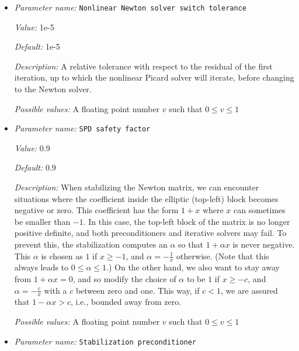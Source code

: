 \begin{itemize}
{\it Possible values:} A floating point number $v$ such that $0 \leq v \leq 1$
\item {\it Parameter name:} {\tt Nonlinear Newton solver switch tolerance}
\label{parameters:Solver parameters/Newton solver parameters/Nonlinear Newton solver switch tolerance}


{\it Value:} 1e-5


{\it Default:} 1e-5


{\it Description:} A relative tolerance with respect to the residual of the first iteration, up to which the nonlinear Picard solver will iterate, before changing to the Newton solver.


{\it Possible values:} A floating point number $v$ such that $0 \leq v \leq 1$
\item {\it Parameter name:} {\tt SPD safety factor}
\label{parameters:Solver parameters/Newton solver parameters/SPD safety factor}


{\it Value:} 0.9


{\it Default:} 0.9


{\it Description:} When stabilizing the Newton matrix, we can encounter situations where the coefficient inside the elliptic (top-left) block becomes negative or zero. This coefficient has the form $1+x$ where $x$ can sometimes be smaller than $-1$. In this case, the top-left block of the matrix is no longer positive definite, and both preconditioners and iterative solvers may fail. To prevent this, the stabilization computes an $\alpha$ so that $1+\alpha x$ is never negative. This $\alpha$ is chosen as $1$ if $x\ge -1$, and $\alpha=-\frac 1x$ otherwise. (Note that this always leads to $0\le \alpha \le 1$.)  On the other hand, we also want to stay away from $1+\alpha x=0$, and so modify the choice of $\alpha$ to be $1$ if $x\ge -c$, and $\alpha=-\frac cx$ with a $c$ between zero and one. This way, if $c<1$, we are assured that $1-\alpha x>c$, i.e., bounded away from zero.


{\it Possible values:} A floating point number $v$ such that $0 \leq v \leq 1$
\item {\it Parameter name:} {\tt Stabilization preconditioner}
\label{parameters:Solver parameters/Newton solver parameters/Stabilization preconditioner}



\end{itemize}
